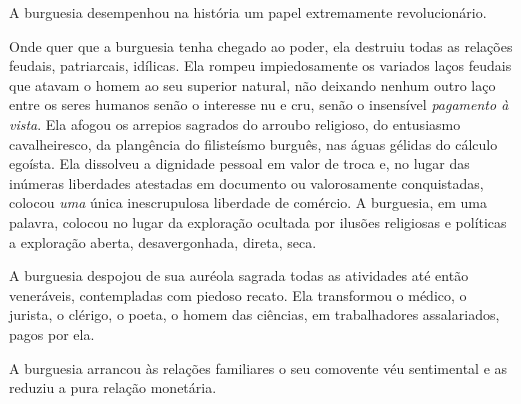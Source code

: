 
A burguesia desempenhou na história um papel extremamente
revolucionário.

Onde quer que a burguesia tenha chegado ao poder, ela destruiu todas as          \label{3}
relações feudais, patriarcais, idílicas. Ela rompeu impiedosamente os
variados laços feudais que atavam o homem ao seu superior natural, não
deixando nenhum outro laço entre os seres humanos senão o interesse nu
e cru, senão o insensível \textit{pagamento à vista}. Ela afogou os arrepios
sagrados do arroubo religioso, do entusiasmo cavalheiresco, da
plangência do filisteísmo burguês, nas águas gélidas do cálculo
egoísta. Ela dissolveu a dignidade pessoal em valor de troca e, no lugar
das inúmeras liberdades atestadas em documento ou valorosamente
conquistadas, colocou \textit{uma} única inescrupulosa liberdade de
comércio. A burguesia, em uma palavra, colocou no lugar da exploração
ocultada por ilusões religiosas e políticas a exploração aberta,
desavergonhada, direta, seca.

A burguesia despojou de sua auréola sagrada todas as atividades até
então veneráveis, contempladas com piedoso recato. Ela transformou o
médico, o jurista, o clérigo, o poeta, o homem das ciências, em
trabalhadores assalariados, pagos por ela.

A burguesia arrancou às relações familiares o seu comovente véu
sentimental e as reduziu a pura relação monetária.                         

